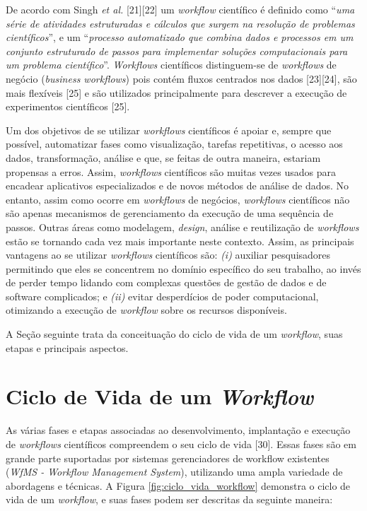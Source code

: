 De acordo com Singh \textit{et al.} [21][22] um \textit{workflow} científico é definido como ``\textit{uma série de atividades estruturadas e cálculos que surgem na resolução de problemas científicos}'', e um ``\textit{processo automatizado que combina dados e processos em um conjunto estruturado de passos para implementar soluções computacionais para um problema científico}''. \textit{Workflows} científicos distinguem-se de \textit{workflows} de negócio (\textit{business workflows}) pois contém fluxos centrados nos dados [23][24], são mais flexíveis [25] e são utilizados principalmente para descrever a execução de experimentos científicos [25].

Um dos objetivos de se utilizar \textit{workflows} científicos é apoiar e, sempre que possível, automatizar fases como visualização, tarefas repetitivas, o acesso aos dados, transformação, análise e que, se feitas de outra maneira, estariam propensas a erros. Assim, \textit{workflows} científicos são muitas vezes usados para encadear aplicativos especializados e de novos métodos de análise de dados. No entanto, assim como ocorre em \textit{workflows} de negócios, \textit{workflows} científicos não são apenas mecanismos de gerenciamento da execução de uma sequência de passos. Outras áreas como modelagem, \textit{design}, análise e reutilização de \textit{workflows} estão se tornando cada vez mais importante neste contexto. Assim, as principais vantagens ao se utilizar \textit{workflows} científicos são: \textit{(i)} auxiliar pesquisadores permitindo que eles se concentrem no domínio específico do seu trabalho, ao invés de perder tempo lidando com complexas questões de gestão de dados e de software complicados; e \textit{(ii)} evitar desperdícios de poder computacional, otimizando a execução de \textit{workflow} sobre os recursos disponíveis.

A Seção seguinte trata da conceituação do ciclo de vida de um \textit{workflow}, suas etapas e principais aspectos.

\section{Ciclo de Vida de um \textit{Workflow}} \label{cap3sec2}

As várias fases e etapas associadas ao desenvolvimento, implantação e execução de \textit{workflows} científicos compreendem o seu ciclo de vida [30]. Essas fases são em grande parte suportadas por sistemas gerenciadores de workflow existentes (\textit{WfMS - Workflow Management System}), utilizando uma ampla variedade de abordagens e técnicas. A Figura \ref{fig:ciclo_vida_workflow} demonstra o ciclo de vida de um \textit{workflow}, e suas fases podem ser descritas da seguinte maneira:

